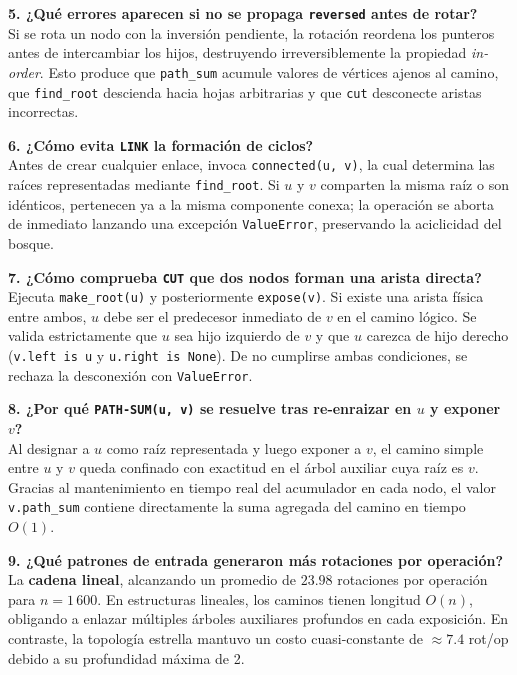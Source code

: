 \smallskip
\noindent\textbf{5. ¿Qué errores aparecen si no se propaga \texttt{reversed} antes de rotar?}\\
Si se rota un nodo con la inversión pendiente, la rotación reordena los punteros antes de intercambiar los hijos, destruyendo irreversiblemente la propiedad \textit{in-order}. Esto produce que \texttt{path\_sum} acumule valores de vértices ajenos al camino, que \texttt{find\_root} descienda hacia hojas arbitrarias y que \texttt{cut} desconecte aristas incorrectas.

\smallskip
\noindent\textbf{6. ¿Cómo evita \texttt{LINK} la formación de ciclos?}\\
Antes de crear cualquier enlace, invoca \texttt{connected(u, v)}, la cual determina las raíces representadas mediante \texttt{find\_root}. Si $u$ y $v$ comparten la misma raíz o son idénticos, pertenecen ya a la misma componente conexa; la operación se aborta de inmediato lanzando una excepción \texttt{ValueError}, preservando la aciclicidad del bosque.

\pagebreak
\noindent\textbf{7. ¿Cómo comprueba \texttt{CUT} que dos nodos forman una arista directa?}\\
Ejecuta \texttt{make\_root(u)} y posteriormente \texttt{expose(v)}. Si existe una arista física entre ambos, $u$ debe ser el predecesor inmediato de $v$ en el camino lógico. Se valida estrictamente que $u$ sea hijo izquierdo de $v$ y que $u$ carezca de hijo derecho (\texttt{v.left is u} y \texttt{u.right is None}). De no cumplirse ambas condiciones, se rechaza la desconexión con \texttt{ValueError}.

\smallskip
\noindent\textbf{8. ¿Por qué \texttt{PATH-SUM(u, v)} se resuelve tras re-enraizar en $u$ y exponer $v$?} \\
Al designar a $u$ como raíz representada y luego exponer a $v$, el camino simple entre $u$ y $v$ queda confinado con exactitud en el árbol auxiliar cuya raíz es $v$. Gracias al mantenimiento en tiempo real del acumulador en cada nodo, el valor \texttt{v.path\_sum} contiene directamente la suma agregada del camino en tiempo $O(1)$.

\smallskip
\noindent\textbf{9. ¿Qué patrones de entrada generaron más rotaciones por operación?}\\
La \textbf{cadena lineal}, alcanzando un promedio de $23.98$ rotaciones por operación para $n = 1\,600$. En estructuras lineales, los caminos tienen longitud $O(n)$, obligando a enlazar múltiples árboles auxiliares profundos en cada exposición. En contraste, la topología estrella mantuvo un costo cuasi-constante de ${\approx} 7.4$ rot/op debido a su profundidad máxima de 2.

